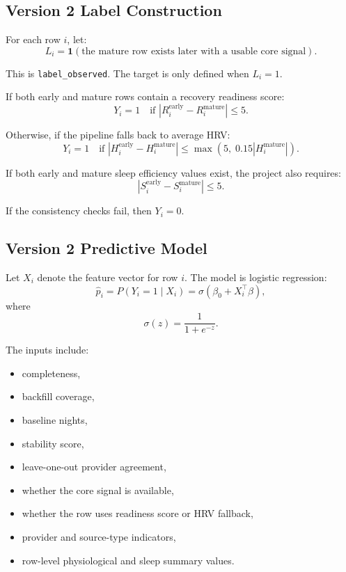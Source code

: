 \documentclass[11pt]{article}
\begin{document}
\subsection{Version 2 Label Construction}

For each row $i$, let:
\[
L_i = \mathbf{1}(\text{the mature row exists later with a usable core signal}).
\]

This is \texttt{label\_observed}. The target is only defined when $L_i = 1$.

If both early and mature rows contain a recovery readiness score:
\[
Y_i = 1
\quad \text{if } \left|R_i^{\text{early}} - R_i^{\text{mature}}\right| \le 5.
\]

Otherwise, if the pipeline falls back to average HRV:
\[
Y_i = 1
\quad \text{if }
\left|H_i^{\text{early}} - H_i^{\text{mature}}\right|
\le
\max\left(5,\;0.15|H_i^{\text{mature}}|\right).
\]

If both early and mature sleep efficiency values exist, the project also requires:
\[
\left|S_i^{\text{early}} - S_i^{\text{mature}}\right| \le 5.
\]

If the consistency checks fail, then $Y_i = 0$.

\subsection{Version 2 Predictive Model}

Let $X_i$ denote the feature vector for row $i$. The model is logistic regression:
\[
\hat{p}_i = P(Y_i = 1 \mid X_i)
= \sigma\left(\beta_0 + X_i^\top \beta\right),
\]
where
\[
\sigma(z) = \frac{1}{1+e^{-z}}.
\]

The inputs include:
\begin{itemize}[leftmargin=1.5em]
    \item completeness,
    \item backfill coverage,
    \item baseline nights,
    \item stability score,
    \item leave-one-out provider agreement,
    \item whether the core signal is available,
    \item whether the row uses readiness score or HRV fallback,
    \item provider and source-type indicators,
    \item row-level physiological and sleep summary values.
\end{itemize}
\end{document}
